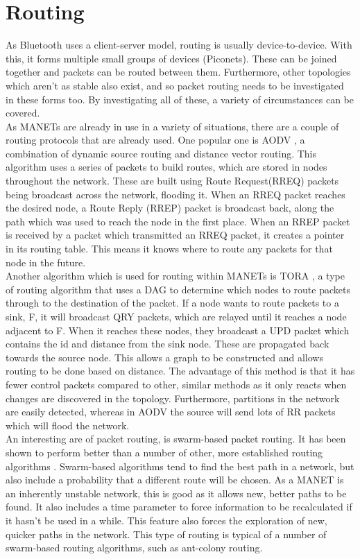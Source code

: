 \documentclass{report}
\begin{document}
\section{Routing}
As Bluetooth uses a client-server model, routing is usually device-to-device. With this, it forms multiple small groups of devices (Piconets). These can be joined together and packets can be routed between them. Furthermore, other topologies which aren't as stable also exist, and so packet routing needs to be investigated in these forms too. By investigating all of these, a variety of circumstances can be covered. 
\bigskip\\
As MANETs are already in use in a variety of situations, there are a couple of routing protocols that are already used. One popular one is AODV \cite{phong2010enhancing, perkins1999ad}, a combination of dynamic source routing and distance vector routing. This algorithm uses a series of packets to build routes, which are stored in nodes throughout the network. These are built using Route Request(RREQ) packets being broadcast across the network, flooding it. When an RREQ packet reaches the desired node, a Route Reply (RREP) packet is broadcast back, along the path which was used to reach the node in the first place. When an RREP packet is received by a packet which transmitted an RREQ packet, it creates a pointer in its routing table. This means it knows where to route any packets for that node in the future. 
\bigskip\\
Another algorithm which is used for routing within MANETs is TORA \cite{park1997highly}, a type of routing algorithm that uses a DAG to determine which nodes to route packets through to the destination of the packet. If a node wants to route packets to a sink, F, it will broadcast QRY packets, which are relayed until it reaches a node adjacent to F. When it reaches these nodes, they broadcast a UPD packet which contains the id and distance from the sink node. These are propagated back towards the source node. This allows a graph to be constructed and allows routing to be done based on distance. The advantage of this method is that it has fewer control packets compared to other, similar methods as it only reacts when changes are discovered in the topology. Furthermore, partitions in the network are easily detected, whereas in AODV the source will send lots of RR packets which will flood the network.    
\bigskip\\
An interesting are of packet routing, is swarm-based packet routing. It has been shown to perform better than a number of other, more established routing algorithms \cite{lin2014performance}. Swarm-based algorithms tend to find the best path in a network, but also include a probability that a different route will be chosen. As a MANET is an inherently unstable network, this is good as it allows new, better paths to be found. It also includes a time parameter to force information to be recalculated if it hasn't be used in a while. This feature also forces the exploration of new, quicker paths in the network. This type of routing is typical of a number of swarm-based routing algorithms, such as ant-colony routing\cite{sharvani2009different}.
\end{document}

